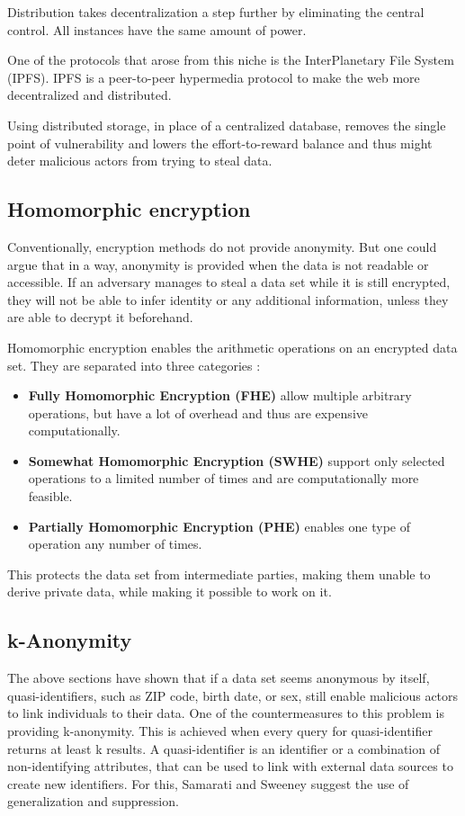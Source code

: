 Distribution takes decentralization a step further by eliminating the central control. All instances have the same amount of power.

One of the protocols that arose from this niche is the InterPlanetary File System (IPFS)\cite{DBLP:journals/corr/Benet14}. IPFS is a peer-to-peer hypermedia protocol to make the web more decentralized and distributed.


Using distributed storage, in place of a centralized database, removes the single point of vulnerability and lowers the effort-to-reward balance and thus might deter malicious actors from trying to steal data.

\subsection{Homomorphic encryption}
Conventionally, encryption methods do not provide anonymity. But one could argue that in a way, anonymity is provided when the data is not readable or accessible. If an adversary manages to steal a data set while it is still encrypted, they will not be able to infer identity or any additional information, unless they are able to decrypt it beforehand. 

Homomorphic encryption enables the arithmetic operations on an encrypted data set. They are separated into three categories \cite{DBLP:journals/corr/abs-1812-02428}:
\begin{itemize}
    \item \textbf{Fully Homomorphic Encryption (FHE)} allow multiple arbitrary operations, but have a lot of overhead and thus are expensive computationally.
    \item \textbf{Somewhat Homomorphic Encryption (SWHE)} support only selected operations to a limited number of times and are computationally more feasible.
    \item \textbf{Partially Homomorphic Encryption (PHE)} enables one type of operation any number of times.
\end{itemize}

This protects the data set from intermediate parties, making them unable to derive private data, while making it possible to work on it.

\subsection{k-Anonymity}
The above sections have shown that if a data set seems anonymous by itself, quasi-identifiers, such as ZIP code, birth date, or sex, still enable malicious actors to link individuals to their data. One of the countermeasures to this problem is providing k-anonymity. This is achieved when every query for quasi-identifier returns at least k results. A quasi-identifier is an identifier or a combination of non-identifying attributes, that can be used to link with external data sources to create new identifiers. For this, Samarati and Sweeney \cite{samarati} \cite{DBLP:journals/ijufks/Sweene02} suggest the use of generalization and suppression.

